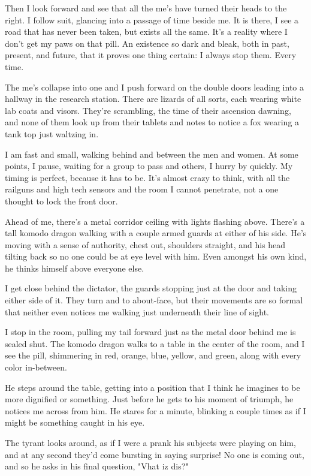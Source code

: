 Then I look forward and see that all the me's have turned their heads to the right. I follow suit, glancing into a passage of time beside me. It is there, I see a road that has never been taken, but exists all the same. It's a reality where I don't get my paws on that pill. An existence so dark and bleak, both in past, present, and future, that it proves one thing certain: I always stop them. Every time.

The me's collapse into one and I push forward on the double doors leading into a hallway in the research station. There are lizards of all sorts, each wearing white lab coats and visors. They're scrambling, the time of their ascension dawning, and none of them look up from their tablets and notes to notice a fox wearing a tank top just waltzing in.

I am fast and small, walking behind and between the men and women. At some points, I pause, waiting for a group to pass and others, I hurry by quickly. My timing is perfect, because it has to be. It's almost crazy to think, with all the railguns and high tech sensors and the room I cannot penetrate, not a one thought to lock the front door.

Ahead of me, there's a metal corridor ceiling with lights flashing above. There's a tall komodo dragon walking with a couple armed guards at either of his side. He's moving with a sense of authority, chest out, shoulders straight, and his head tilting back so no one could be at eye level with him. Even amongst his own kind, he thinks himself above everyone else.

I get close behind the dictator, the guards stopping just at the door and taking either side of it. They turn and to about-face, but their movements are so formal that neither even notices me walking just underneath their line of sight.

I stop in the room, pulling my tail forward just as the metal door behind me is sealed shut. The komodo dragon walks to a table in the center of the room, and I see the pill, shimmering in red, orange, blue, yellow, and green, along with every color in-between.

He steps around the table, getting into a position that I think he imagines to be more dignified or something. Just before he gets to his moment of triumph, he notices me across from him. He stares for a minute, blinking a couple times as if I might be something caught in his eye.

The tyrant looks around, as if I were a prank his subjects were playing on him, and at any second they'd come bursting in saying surprise! No one is coming out, and so he asks in his final question, "Vhat iz dis?"

